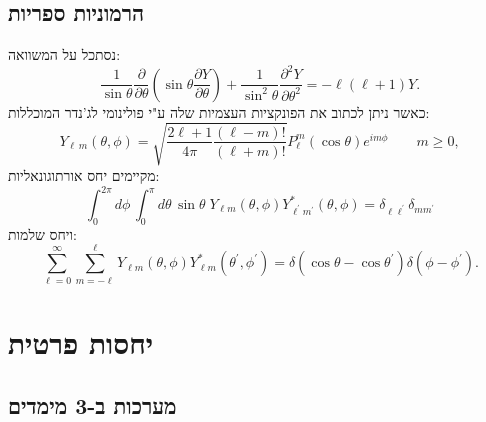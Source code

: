 \documentclass{tstextbook}
\begin{document}
\section{הרמוניות ספריות}

נסתכל על המשוואה:
$$\frac{1}{\sin\theta}\frac{\partial}{\partial\theta}\left(\sin\theta\frac{\partial Y}{\partial\theta}\right)+\frac{1}{\sin^{2}\theta}\frac{\partial^{2}Y}{\partial\theta^{2}}=-\ell(\ell+1)Y.$$
כאשר ניתן לכתוב את הפונקציות העצמיות שלה ע"י פולינומי לג'נדר המוכללות:
$$Y_{\ell\,m}(\theta,\phi)=\sqrt{\frac{2\ell+1}{4\pi}\frac{(\ell-m)!}{(\ell+m)!}}P_{\ell}^{m}(\cos\theta)e^{i m\phi}\qquad m\ge0,$$
מקיימים יחס אורתוגונאליות:
$$\int_{0}^{2\pi}d\phi\,\int_{0}^{\pi}d\theta\,\sin\theta\;Y_{\ell m}(\theta,\phi)Y_{\ell^{\prime}m^{\prime}}^{\ast}(\theta,\phi)=\delta_{\ell\ell^{\prime}}\delta_{m m^{\prime}}$$
ויחס שלמות:
$$\sum_{\ell=0}^{\infty}\sum_{m=-\ell}^{\ell}Y_{\ell m}(\theta,\phi)Y_{\ell m}^{*}(\theta^{\prime},\phi^{\prime})=\delta(\cos\theta-\cos\theta^{\prime})\delta(\phi-\phi^{\prime}).$$

\chapter{יחסות פרטית}

\section{מערכות ב-3 מימדים}
\end{document}
